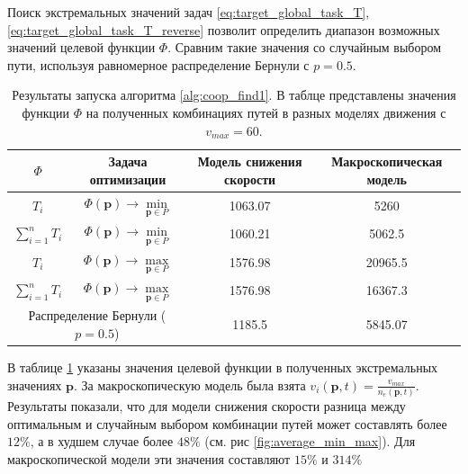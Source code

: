 \documentclass[12pt, a4paper]{article}
\begin{document}
Поиск экстремальных значений задач \eqref{eq:target_global_task_T}, \eqref{eq:target_global_task_T_reverse} позволит определить диапазон возможных значений целевой функции $\Phi$. Сравним такие значения со случайным выбором пути, используя равномерное распределение Бернули с $p = 0.5$.

 
\begin{table}[H]
	\caption{Результаты запуска алгоритма \ref{alg:coop_find1}. В таблце представлены значения функции $\Phi$ на полученных комбинациях путей в разных моделях движения с $v_{max} = 60$.}
	\label{tab:res_average}
	\centering
	\begin{tabular}{|c|c|c|c|}
		\hline
		\multicolumn{1}{|c|}{ $\Phi$} & Задача оптимизации    & Модель снижения скорости & Макроскопическая модель \\ \hline
		\multicolumn{1}{|c|}{$T_i$}      & $\Phi (\textbf{p}) \rightarrow \min \limits_{\textbf{p} \in P}$ & 1063.07                  & 5260                    \\ \hline
		\multicolumn{1}{|c|}{$\sum\limits_{i = 1}^n T_i$} & $\Phi (\textbf{p}) \rightarrow \min \limits_{\textbf{p} \in P}$ & 1060.21                  & 5062.5                  \\ \hline
		\multicolumn{1}{|c|}{$T_i$ }      & $\Phi (\textbf{p}) \rightarrow \max \limits_{\textbf{p} \in P}$ & 1576.98                  & 20965.5                 \\ \hline
		\multicolumn{1}{|c|}{ $\sum\limits_{i = 1}^n T_i$} & $\Phi (\textbf{p}) \rightarrow \max \limits_{\textbf{p} \in P}$ & 1576.98                  & 16367.3                 \\ \hline
		\multicolumn{2}{|c|}{ Распределение Бернули ($p = 0.5$)}     & 1185.5                   & 5845.07                 \\ \hline
	\end{tabular}
\end{table}

В таблице \ref{tab:res_average} указаны значения целевой функции в полученных экстремальных значениях $\textbf{p}$. За макроскопическую модель была взята $v_i(\textbf{p}, t) = \frac{v_{max}}{n_e(\textbf{p}, t)}$. Результаты показали, что для модели снижения скорости разница между оптимальным и случайным выбором комбинации путей может составлять более $12\%$, а в худшем случае более $48\%$ (см. рис \ref{fig:average_min_max}). Для макроскопической модели эти значения составляют $15\%$ и $314\%$
\end{document}
